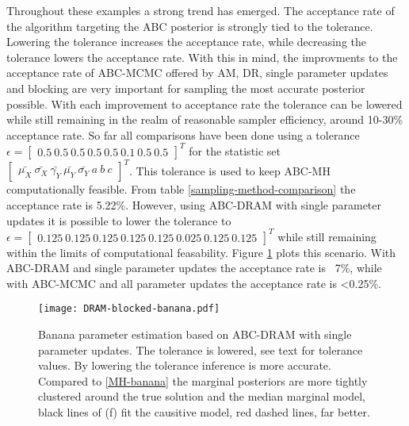 Throughout these examples a strong trend has emerged. The acceptance rate of the algorithm targeting the ABC posterior is strongly tied to the tolerance. Lowering the tolerance increases the acceptance rate, while decreasing the tolerance lowers the acceptance rate. With this in mind, the improvments to the acceptance rate of ABC-MCMC offered by AM, DR, single parameter updates and blocking are very important for sampling the most accurate posterior possible. With each improvement to acceptance rate the tolerance can be lowered while still remaining in the realm of reasonable sampler efficiency, around 10-30\% acceptance rate. So far all comparisons have been done using a tolerance $\epsilon =\begin{bmatrix}
0.5\ 0.5\ 0.5\ 0.5\ 0.5\ 0.1\ 0.5\ 0.5
\end{bmatrix}^T$ 
for the statistic set $\begin{bmatrix}
\bar{\mu_X}\ \bar{\sigma_X}\ \bar{\gamma_Y}\ \bar{\mu_Y}\ \bar{\sigma_Y}\ a\ b\ c
\end{bmatrix}^T$. This tolerance is used to keep ABC-MH computationally feasible. From table \ref{sampling-method-comparison} the acceptance rate is 5.22\%. However, using ABC-DRAM with single parameter updates it is possible to lower the tolerance to 
$\epsilon = \begin{bmatrix}
0.125\ 0.125\ 0.125\ 0.125\ 0.125\ 0.025\ 0.125\ 0.125
\end{bmatrix}^T$
while still remaining within the limits of computational feasability. Figure \ref{best-banana} plots this scenario. With ABC-DRAM and single parameter updates the acceptance rate is ~7\%, while with ABC-MCMC and all parameter updates the acceptance rate is <0.25\%.

\begin{figure}[H]
\centering
\texttt{[image: DRAM-blocked-banana.pdf]}
\caption{Banana parameter estimation based on ABC-DRAM with single parameter updates. The tolerance is lowered, see text for tolerance values. By lowering the tolerance inference is more accurate. Compared to \ref{MH-banana} the marginal posteriors are more tightly clustered around the true solution and the median marginal model, black lines of (f) fit the causitive model, red dashed lines, far better.}
\label{best-banana}
\end{figure}